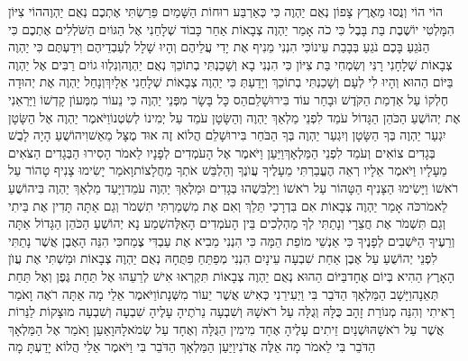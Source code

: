 \documentclass[../main/main.tex]{subfiles}
\begin{document}
\begin{multicols*}{\ncols}
הוֹי הוֹי וְנֻסוּ מֵאֶרֶץ צָפוֹן נְאֻם יַהְוֶה כִּי כְּאַרְבַּע רוּחוֹת הַשָּׁמַיִם פֵּרַשְׂתִּי אֶתְכֶם נְאֻם יַהְוֶה\PreVerseSpace{}הוֹי צִיּוֹן הִמָּלְטִי יוֹשֶׁבֶת בַּת בָּבֶל \ClosedSection{}כִּי כֹה אָמַר יַהְוֶה צְבָאוֹת אַחַר כָּבוֹד שְׁלָחַנִי אֶל הַגּוֹיִם הַשֹּׁלְלִים אֶתְכֶם כִּי הַנֹּגֵעַ בָּכֶם נֹגֵעַ בְּבָבַת עֵינוֹ\PreVerseSpace{}כִּי הִנְנִי מֵנִיף אֶת יָדִי עֲלֵיהֶם וְהָיוּ שָׁלָל לְעַבְדֵיהֶם וִידַעְתֶּם כִּי יַהְוֶה צְבָאוֹת שְׁלָחָנִי \ClosedSection{}רָנִּי וְשִׂמְחִי בַּת צִיּוֹן כִּי הִנְנִי בָא וְשָׁכַנְתִּי בְתוֹכֵךְ נְאֻם יַהְוֶה\PreVerseSpace{}וְנִלְווּ גוֹיִם רַבִּים אֶל יַהְוֶה בַּיּוֹם הַהוּא וְהָיוּ לִי לְעָם וְשָׁכַנְתִּי בְתוֹכֵךְ וְיָדַעַתְּ כִּי יַהְוֶה צְבָאוֹת שְׁלָחַנִי אֵלָיִךְ\PreVerseSpace{}וְנָחַל יַהְוֶה אֶת יְהוּדָה חֶלְקוֹ עַל אַדְמַת הַקֹּדֶשׁ וּבָחַר עוֹד בִּירוּשָׁלֵם\PreVerseSpace{}הַס כָּל בָּשָׂר מִפְּנֵי יַהְוֶה כִּי נֵעוֹר מִמְּעוֹן קָדְשׁוֹ \ClosedSection{}וַיַּרְאֵנִי אֶת יְהוֹשֻׁעַ הַכֹּהֵן הַגָּדוֹל עֹמֵד לִפְנֵי מַלְאַךְ יַהְוֶה וְהַשָּׂטָן עֹמֵד עַל יְמִינוֹ לְשִׂטְנוֹ\PreVerseSpace{}וַיֹּאמֶר יַהְוֶה אֶל הַשָּׂטָן יִגְעַר יַהְוֶה בְּךָ הַשָּׂטָן וְיִגְעַר יַהְוֶה בְּךָ הַבֹּחֵר בִּירוּשָׁלֵם הֲלוֹא זֶה אוּד מֻצָּל מֵאֵשׁ\PreVerseSpace{}וִיהוֹשֻׁעַ הָיָה לָבֻשׁ בְּגָדִים צוֹאִים וְעֹמֵד לִפְנֵי הַמַּלְאָךְ\PreVerseSpace{}וַיַּעַן וַיֹּאמֶר אֶל הָעֹמְדִים לְפָנָיו לֵאמֹר הָסִירוּ הַבְּגָדִים הַצֹּאִים מֵעָלָיו וַיֹּאמֶר אֵלָיו רְאֵה הֶעֱבַרְתִּי מֵעָלֶיךָ עֲוֺנֶךָ וְהַלְבֵּשׁ אֹתְךָ מַחֲלָצוֹת\PreVerseSpace{}וָאֹמַר יָשִׂימוּ צָנִיף טָהוֹר עַל רֹאשׁוֹ וַיָּשִׂימוּ הַצָּנִיף הַטָּהוֹר עַל רֹאשׁוֹ וַיַּלְבִּשֻׁהוּ בְּגָדִים וּמַלְאַךְ יַהְוֶה עֹמֵד\PreVerseSpace{}וַיָּעַד מַלְאַךְ יַהְוֶה בִּיהוֹשֻׁעַ לֵאמֹר\PreVerseSpace{}כֹּה אָמַר יַהְוֶה צְבָאוֹת אִם בִּדְרָכַי תֵּלֵךְ וְאִם אֶת מִשְׁמַרְתִּי תִשְׁמֹר וְגַם אַתָּה תָּדִין אֶת בֵּיתִי וְגַם תִּשְׁמֹר אֶת חֲצֵרָי וְנָתַתִּי לְךָ מַהְלְכִים בֵּין הָעֹמְדִים הָאֵלֶּה\PreVerseSpace{}שְׁמַע נָא יְהוֹשֻׁעַ הַכֹּהֵן הַגָּדוֹל אַתָּה וְרֵעֶיךָ הַיֹּשְׁבִים לְפָנֶיךָ כִּי אַנְשֵׁי מוֹפֵת הֵמָּה כִּי הִנְנִי מֵבִיא אֶת עַבְדִּי צֶמַח\PreVerseSpace{}כִּי הִנֵּה הָאֶבֶן אֲשֶׁר נָתַתִּי לִפְנֵי יְהוֹשֻׁעַ עַל אֶבֶן אַחַת שִׁבְעָה עֵינָיִם הִנְנִי מְפַתֵּחַ פִּתֻּחָהּ נְאֻם יַהְוֶה צְבָאוֹת וּמַשְׁתִּי אֶת עֲוֺן הָאָרֶץ הַהִיא בְּיוֹם אֶחָד\PreVerseSpace{}בַּיּוֹם הַהוּא נְאֻם יַהְוֶה צְבָאוֹת תִּקְרְאוּ אִישׁ לְרֵעֵהוּ אֶל תַּחַת גֶּפֶן וְאֶל תַּחַת תְּאֵנָה\PreChapterSpace{}וַיָּשָׁב הַמַּלְאָךְ הַדֹּבֵר בִּי וַיְעִירֵנִי כְּאִישׁ אֲשֶׁר יֵעוֹר מִשְּׁנָתוֹ\PreVerseSpace{}וַיֹּאמֶר אֵלַי מָה אַתָּה רֹאֶה וָאֹמַר\SubEnd{} רָאִיתִי וְהִנֵּה מְנוֹרַת זָהָב כֻּלָּהּ וְגֻלָּה עַל רֹאשָׁהּ וְשִׁבְעָה נֵרֹתֶיהָ עָלֶיהָ שִׁבְעָה וְשִׁבְעָה מוּצָקוֹת לַנֵּרוֹת אֲשֶׁר עַל רֹאשָׁהּ\PreVerseSpace{}וּשְׁנַיִם זֵיתִים עָלֶיהָ אֶחָד מִימִין הַגֻּלָּה וְאֶחָד עַל שְׂמֹאלָהּ\PreVerseSpace{}וָאַעַן וָאֹמַר אֶל הַמַּלְאָךְ הַדֹּבֵר בִּי לֵאמֹר מָה אֵלֶּה אֲדֹנִי\PreVerseSpace{}וַיַּעַן הַמַּלְאָךְ הַדֹּבֵר בִּי וַיֹּאמֶר אֵלַי הֲלוֹא יָדַעְתָּ מָה 
\end{multicols*}
\end{document}
